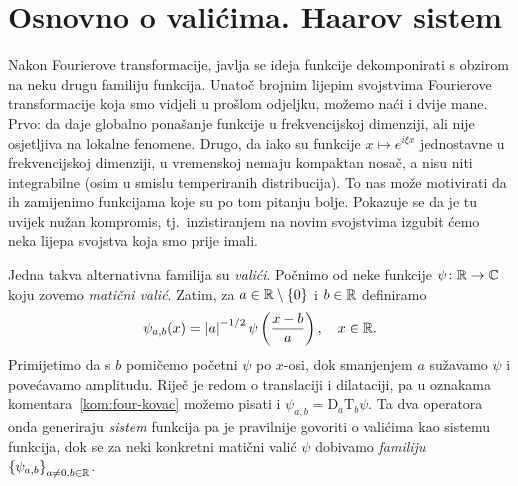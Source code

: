 \documentclass[main.tex]{subfiles}
\newcommand{\mr}[1]{\mathrm{#1}}
\begin{document}
\section{Osnovno o valićima. Haarov sistem}\label{sec:val1}
Nakon Fourierove transformacije, javlja se ideja funkcije dekomponirati
s obzirom na neku drugu familiju funkcija. Unatoč brojnim lijepim svojstvima
Fourierove transformacije koja smo vidjeli u prošlom odjeljku, možemo naći i dvije
mane. Prvo: da daje globalno ponašanje funkcije u frekvencijskoj dimenziji, ali
nije osjetljiva na lokalne fenomene. Drugo, da iako su funkcije
\( x \mapsto e^{i\xi x} \) jednostavne u frekvencijskoj dimenziji,
u vremenskoj nemaju kompaktan nosač, a nisu niti integrabilne (osim u smislu temperiranih distribucija).
To nas može motivirati da ih zamijenimo funkcijama koje su po tom pitanju bolje.
Pokazuje se da je tu uvijek nužan kompromis, tj.\ inzistiranjem na novim svojstvima
izgubit ćemo neka lijepa svojstva koja smo prije imali.

Jedna takva alternativna familija su \emph{valići}.
Počnimo od neke funkcije \( \psi \colon \mathbb{R} \to \mathbb{C} \)
koju zovemo \emph{matični valić}.
Zatim, za \( a \in \mathbb{R} \setminus \left\{ 0 \right\} \)
i \( b \in \mathbb{R} \) definiramo
\begin{equation}
	\psi_{a,b}(x) = \left| {a} \right|^{-1/2} \psi \left( \frac {x-b}a \right), \quad x \in \mathbb{R}.
\end{equation}
Primijetimo da s \( b \) pomičemo početni \( \psi \) po \( x \)-osi, dok smanjenjem \( a \)
sužavamo \( \psi \) i povećavamo amplitudu. Riječ je redom o translaciji i dilataciji,
pa u oznakama komentara~\ref{kom:four-kovac} možemo pisati i
\( \psi_{a,b} = \mr D_a \mr T_b \psi \). Ta dva operatora onda generiraju
\emph{sistem} funkcija pa je pravilnije govoriti o valićima kao sistemu funkcija,
dok se za neki konkretni matični valić \( \psi \) dobivamo \emph{familiju} \( \left\{ \psi_{a,b} \right\}_{a\neq 0, b \in \mathbb{R}} \).
\end{document}
